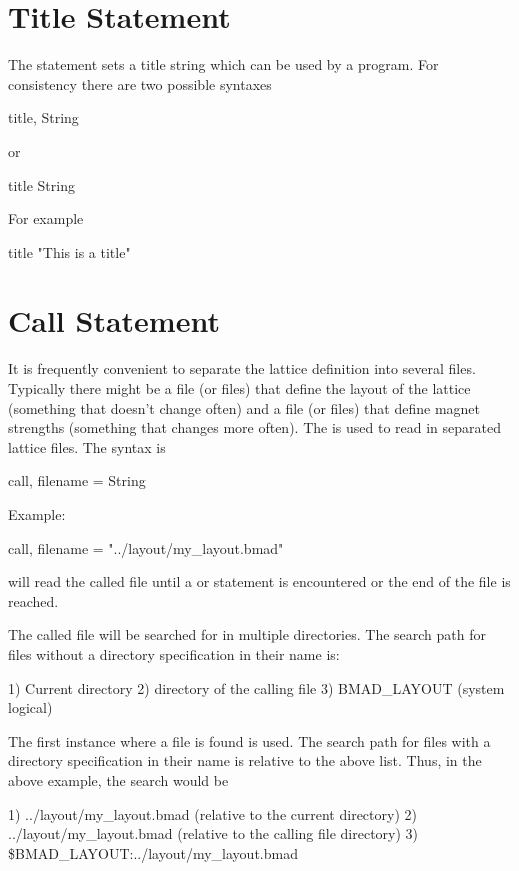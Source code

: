 {%
\section{Title Statement}

The  statement sets a title string which can be used by a program. 
For consistency there are two possible syntaxes
\begin{example}
  title, String
\end{example}
or
\begin{example}
  title
  String
\end{example}
For example
\begin{example}
  title
  "This is a title"
\end{example}

\section{Call Statement}

It is frequently convenient to separate the lattice definition into
several files.  Typically there might be a file (or files) that define
the layout of the lattice (something that doesn't change often) and a
file (or files) that define magnet strengths (something that changes
more often).  The  is used to read in separated lattice
files. The syntax is
\begin{example}
  call, filename = String
\end{example}
Example:
\begin{example}
  call, filename = "../layout/my_layout.bmad"
\end{example}
\bmad will read the called file until a  or 
statement is encountered or the end of the file is reached.

The called file will be searched for in multiple directories.
The search path for files without a directory specification in their name is:
\begin{example}
	1) Current directory
	2) directory of the calling file
	3) BMAD_LAYOUT (system logical)
\end{example}
The first instance where a file is found is used.
The search path for files with a directory specification in their name
is relative to the above list. Thus, in the above example, the search
would be
\begin{example}
  1) ../layout/my_layout.bmad  (relative to the current directory)
  2) ../layout/my_layout.bmad  (relative to the calling file directory)
  3) \$BMAD_LAYOUT:../layout/my_layout.bmad 
\end{example}

}
